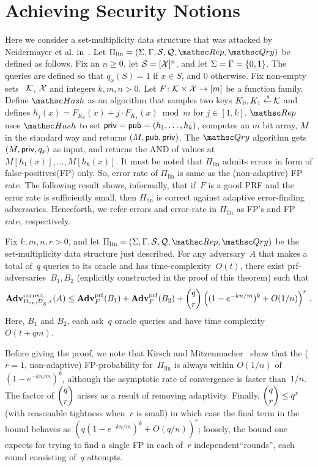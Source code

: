 \section{Achieving Security Notions}



Here we consider a set-multiplicity data structure that was attacked by Neidermayer et al. in~\cite{xxx}.  Let $\Pi_{\mathrm{lin}}= (\Sigma,\Gamma,\calS,\calQ,\Rep, \Qry)$ be defined as follows. Fix an $n \geq 0$, let $\mathcal{S}=[{\cal X}]^n$, and let $\Sigma=\Gamma=\{0,1\}$. The queries are defined so that $q_x(S)=1$ if $x \in S$, and 0 otherwise.  Fix non-empty sets ~${\cal K}$, ${\cal X}$ and integers $k,m,n>0$.  Let $F\colon\mathcal{K} \times {\cal X} \to [m]$ be a function family. Define $\Hash$ as an algorithm that samples two keys $K_0,K_1 {\:\stackrel{{\scriptscriptstyle \hspace{0.2em}\$}} {\leftarrow}\:} \mathcal{K}$ and defines $h_j(x) = F_{K_0}(x) + j\cdot F_{K_1}(x) \bmod m$ for $j \in [1,k]$.  $\Rep$ uses $\Hash$ to set ${\sf priv}={\sf pub} = (h_1, \ldots, h_k)$, computes an $m$ bit array, $M$ in the standard way and returns $(M,{\sf pub},{\sf priv})$.  The $\Qry$ algorithm gets $(M,{\sf priv}, q_x)$ as input, and returns the AND of values at $M[h_1(x)],\ldots,M[h_k(x)]$. It must be noted that $\Pi_{\mathrm{lin}}$ admits errors in form of false-positives(FP) only. So, error rate of $\Pi_{\mathrm{lin}}$ is same as the (non-adaptive) FP rate. The following result shows, informally, that if~$F$ is a good PRF and the error rate is sufficiently small, then $\Pi_\mathrm{lin}$ is correct against adaptive error-finding adversaries. Henceforth, we refer errors and error-rate in $\Pi_{\mathrm{lin}}$ as FP's and FP rate, respectively.

\begin{theorem}\label{thm1}
Fix $k,m,n,r>0$, and let $\Pi_{\mathrm{lin}}= (\Sigma,\Gamma,\calS,\calQ,\Rep, \Qry)$ be the set-multiplicity data structure just described. For any adversary~$A$ that makes a total of~$q$ queries to its oracle and has time-complexity~$O(t)$, there exist prf-adversaries~$B_1,B_2$ (explicitly constructed in the proof of this theorem) such that
\[
\mathrm{\mathbf{Adv}}^{\mathrm{correct}}_{\Pi_{\mathrm{lin}},\mathcal{D}_{{\cal S}}^{},r}(A) \leq  \mathbf{Adv}^{\mathrm{prf}}_{F}(B_1) + \mathbf{Adv}^{\mathrm{prf}}_{F}(B_2)  +{\dbinom{q}{r}} \left( (1-e^{-kn/m})^k + O(1/n) \right)^r\,.
\]
Here, $B_1$ and $B_2$, each ask~$q$ oracle queries and have time complexity~$O(t+qm)$.
\end{theorem}
Before giving the proof, we note that Kirsch and Mitzenmacher~\cite{xxx} show
that the ($r=1$, non-adaptive) FP-probability for~$\Pi_\mathrm{lin}$ is
always within $O(1/n)$ of $(1-e^{-kn/m})^k$, although the asymptotic
rate of convergence is faster than~$1/n$.  The factor of $\dbinom{q}{r}$ arises as a result
of removing adaptivity.  Finally, $\dbinom{q}{r} \leq q^r$ (with
reasonable tightness when~$r$ is small) in which case the final term in the bound behaves as
$(q (1-e^{-kn/m})^k + O(q/n) )^r$; loosely, the bound one expects for
trying to find a single FP in each of~$r$ independent``rounds'', each round
consisting of~$q$ attempts.

